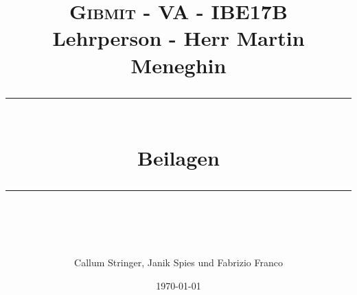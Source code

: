 \title{	
	\normalfont\small
	\textsc{Gibmit - VA - IBE17B}\\ 
	{Lehrperson - Herr Martin Meneghin}
	\vspace{25pt} 
	\rule{\linewidth}{0.5pt}\\
	\vspace{16pt} 
	{\huge Beilagen}\\ 
	\vspace{10pt} 
	\rule{\linewidth}{2pt}\\ 
	\author{\large Callum Stringer, Janik Spies und Fabrizio Franco} 
	\vspace{12pt} 
	\date{\small\today} 
}


\maketitle